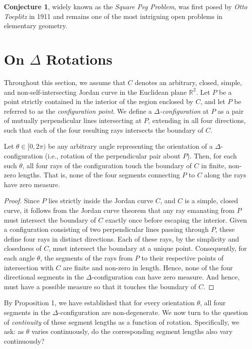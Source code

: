 \textbf{Conjecture 1}, widely known as the \emph{Square Peg Problem}, was first posed by \emph{Otto Toeplitz} in 1911 and remains one of the most intriguing open problems in elementary geometry.

\section{On $\Delta$ Rotations}

Throughout this section, we assume that $C$ denotes an arbitrary, closed, simple, and non-self-intersecting Jordan curve in the Euclidean plane $\mathbb{R}^2$. Let $P$ be a point strictly contained in the interior of the region enclosed by $C$, and let $P$ be referred to as the \emph{configuration point}. We define a \emph{$\Delta$-configuration} at $P$ as a pair of mutually perpendicular lines intersecting at $P$, extending in all four directions, such that each of the four resulting rays intersects the boundary of $C$.

\begin{proposition}
Let $\theta \in [0, 2\pi)$ be any arbitrary angle representing the orientation of a $\Delta$-configuration (i.e., rotation of the perpendicular pair about $P$). Then, for each such $\theta$, all four rays of the configuration touch the boundary of $C$ in finite, non-zero lengths. That is, none of the four segments connecting $P$ to $C$ along the rays have zero measure.
\end{proposition}

\begin{proof}
Since $P$ lies strictly inside the Jordan curve $C$, and $C$ is a simple, closed curve, it follows from the Jordan curve theorem that any ray emanating from $P$ must intersect the boundary of $C$ exactly once before escaping the interior. Given a configuration consisting of two perpendicular lines passing through $P$, these define four rays in distinct directions. Each of these rays, by the simplicity and closedness of $C$, must intersect the boundary at a unique point. Consequently, for each angle $\theta$, the segments of the rays from $P$ to their respective points of intersection with $C$ are finite and non-zero in length. Hence, none of the four directional segments in the $\Delta$-configuration can have zero measure. And hence, must have a possible measure so that it touches the boundary of $C$.
\end{proof}

By Proposition 1, we have established that for every orientation $\theta$, all four segments in the $\Delta$-configuration are non-degenerate. We now turn to the question of \emph{continuity} of these segment lengths as a function of rotation. Specifically, we ask: as $\theta$ varies continuously, do the corresponding segment lengths also vary continuously?

